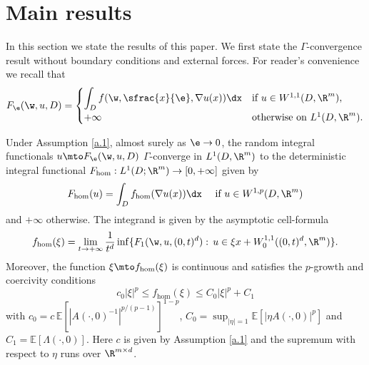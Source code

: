 \section{Main results}\label{s.results}
In this section we state the results of this paper. We first state the $\Gamma$-convergence result without boundary conditions and external forces. For reader's convenience we recall that
\begin{equation*}
F_{\e}(\w,u,D)=
\begin{cases}
\displaystyle \int_D f(\w,\sfrac{x}{\e},\nabla u(x))\dx &\mbox{if $u\in W^{1,1}(D,\R^m)$},
\\[5pt]
+\infty &\mbox{otherwise on $L^1(D,\R^m)$.}
\end{cases}
\end{equation*}
\begin{theorem}\label{thm.Gamma_pure}
Under Assumption \ref{a.1}, almost surely as $\e\to 0$, the random integral functionals
$u\mto F_{\e}(\w,u,D)$ $\Gamma$-converge in $L^1(D,\R^m)$ to the deterministic integral functional $F_{\hom}:L^1(D;\R^m)\to [0,+\infty]$ given by
\begin{equation*}
F_{\hom}(u)= \int_D f_{\hom}(\nabla u(x))\dx\quad\text{ if }u\in W^{1,p}(D,\R^m)
\end{equation*}
and $+\infty$ otherwise. The integrand is given by the asymptotic cell-formula
\begin{equation*}
f_{\hom}(\xi)=\lim_{t\to +\infty}\frac{1}{t^d}\inf\{F_1(\w,u,(0,t)^d):\,u\in \xi x+W^{1,1}_0((0,t)^d,\R^m)\}.
\end{equation*}
Moreover, the function $\xi\mto f_{\hom}(\xi)$ is continuous and satisfies the $p$-growth and coercivity conditions
\begin{equation*}
c_0|\xi|^p\leq f_{\hom}(\xi)\leq C_0|\xi|^p+C_1
\end{equation*}
with $c_0=c\,\mathbb{E}[|A(\cdot,0)^{-1}|^{p/(p-1)}]^{1-p}$, $C_0=\sup_{|\eta|=1}\mathbb{E}[|\eta A(\cdot,0)|^p]$ and $C_1=\mathbb{E}[\Lambda(\cdot,0)]$. Here $c$ is given by Assumption \ref{a.1} and the supremum with respect to $\eta$ runs over $\R^{m\times d}$.
\end{theorem}
\skpt
